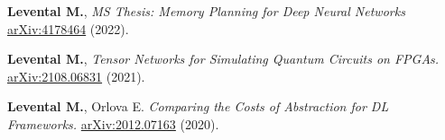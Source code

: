 \documentclass[11pt,letterpaper,roman,colorlinks,linkcolor=blue]{moderncv}
\begin{document}
\begin{hangingpar}
\textbf{Levental M.},
\textit{MS Thesis: Memory Planning for Deep Neural Networks} 
\href{https://arxiv.org/submit/4178464/view}{arXiv:4178464} (2022).
\end{hangingpar}

\begin{hangingpar}
\textbf{Levental M.},
\textit{Tensor Networks for Simulating Quantum Circuits on FPGAs.} 
\href{https://arxiv.org/abs/2108.06831}{arXiv:2108.06831} (2021).
\end{hangingpar}

\begin{hangingpar}
\textbf{Levental M.}, Orlova E.
\textit{Comparing the Costs of Abstraction for DL Frameworks.} 
\href{https://arxiv.org/abs/2012.07163}{arXiv:2012.07163} (2020).
\end{hangingpar}

%
%
%
\end{document}
